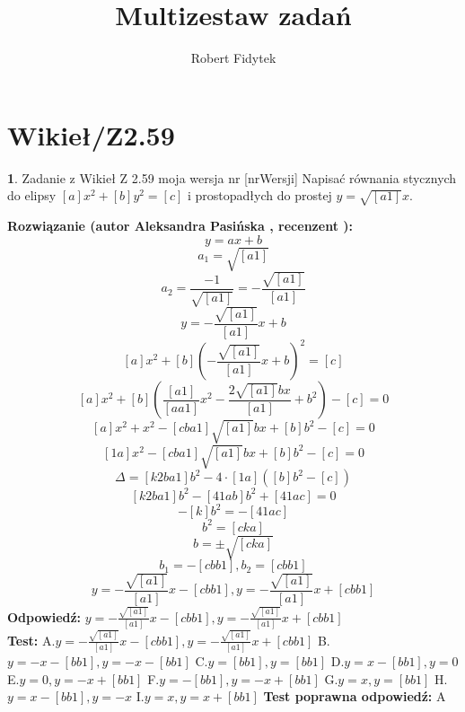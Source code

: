 \documentclass[12pt, a4paper]{article}
\title{Multizestaw zadań}
\author{Robert Fidytek}
\date{}
\theoremstyle{definition} %
\newtheorem{zad}{}
\newcommand{\kategoria}[1]{\section{#1}} %
\newcommand{\zadStart}[1]{\begin{zad}#1\newline} %
\newcommand{\zadStop}{\end{zad}}   %
\newcommand{\rozwStart}[2]{\noindent \textbf{Rozwiązanie (autor #1 , recenzent #2): }\newline} %
\newcommand{\rozwStop}{\newline}                                            %
\newcommand{\odpStart}{\noindent \textbf{Odpowiedź:}\newline}    %
\newcommand{\odpStop}{\newline}                                             %
\newcommand{\testStart}{\noindent \textbf{Test:}\newline} %
\newcommand{\testStop}{\newline} %
\newcommand{\kluczStart}{\noindent \textbf{Test poprawna odpowiedź:}\newline} %
\newcommand{\kluczStop}{\newline} %
\begin{document}
\maketitle


\kategoria{Wikieł/Z2.59}
\zadStart{Zadanie z Wikieł Z 2.59 moja wersja nr [nrWersji]}
Napisać równania stycznych do elipsy $[a]x^2+[b]y^2=[c]$ i prostopadłych do prostej $y=\sqrt{[a1]}x$.
\zadStop
\rozwStart{Aleksandra Pasińska}{}
$$y=ax+b$$
$$a_1=\sqrt{[a1]}$$
$$a_2=\frac{-1}{\sqrt{[a1]}}=-\frac{\sqrt{[a1]}}{[a1]}$$
$$y=-\frac{\sqrt{[a1]}}{[a1]}x+b$$
$$[a]x^2+[b](-\frac{\sqrt{[a1]}}{[a1]}x+b)^2=[c]$$
$$[a]x^2+[b](\frac{[a1]}{[aa1]}x^2-\frac{2\sqrt{[a1]}bx}{[a1]}+b^2)-[c]=0$$
$$[a]x^2+x^2-[cba1]\sqrt{[a1]}bx+[b]b^2-[c]=0$$
$$[1a]x^2-[cba1]\sqrt{[a1]}bx+[b]b^2-[c]=0$$
$$\Delta=[k2ba1]b^2-4\cdot[1a]([b]b^2-[c])$$
$$[k2ba1]b^2-[41ab]b^2+[41ac]=0$$
$$-[k]b^2=-[41ac]$$
$$b^2=[cka]$$
$$b=\pm \sqrt{[cka]}$$
$$b_1=-[cbb1],b_2=[cbb1]$$
$$ y=-\frac{\sqrt{[a1]}}{[a1]}x-[cbb1], y=-\frac{\sqrt{[a1]}}{[a1]}x+[cbb1]$$
\rozwStop
\odpStart
$ y=-\frac{\sqrt{[a1]}}{[a1]}x-[cbb1], y=-\frac{\sqrt{[a1]}}{[a1]}x+[cbb1]$\\
\odpStop
\testStart
A.$ y=-\frac{\sqrt{[a1]}}{[a1]}x-[cbb1], y=-\frac{\sqrt{[a1]}}{[a1]}x+[cbb1]$
B.$ y=-x-[bb1], y=-x-[bb1]$
C.$ y=[bb1], y=[bb1]$
D.$ y=x-[bb1], y=0$
E.$ y=0, y=-x+[bb1]$
F.$ y=-[bb1], y=-x+[bb1]$
G.$ y=x, y=[bb1]$
H.$ y=x-[bb1], y=-x$
I.$ y=x, y=x+[bb1]$
\testStop
\kluczStart
A
\kluczStop
\end{document}
